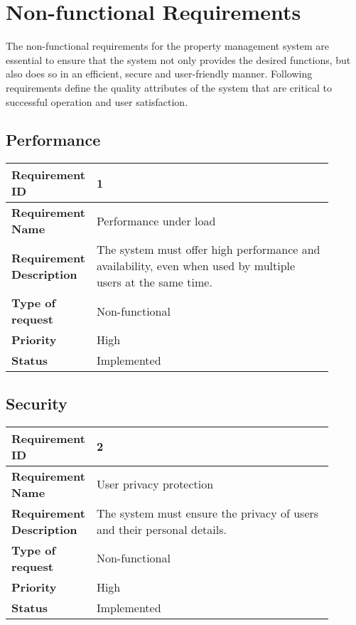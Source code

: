 \section{Non-functional Requirements}
The non-functional requirements for the property management system are essential to ensure that the system not only provides the desired functions, but also does so in an efficient, secure and user-friendly manner. Following requirements define the quality attributes of the system that are critical to successful operation and user satisfaction.

\subsection{Performance}
\begin{table}[htbp]
  \centering
\begin{tabular}{|m{0.15\linewidth}|m{0.75\linewidth}|}
    \hline
    \textbf{Requirement ID} & 1 \\
    \hline
    \textbf{Requirement Name} & Performance under load \\
    \hline
    \textbf{Requirement Description} & The system must offer high performance and availability, even when used by multiple users at the same time. \\
    \hline
    \textbf{Type of request} & Non-functional \\
    \hline
    \textbf{Priority} & High \\
    \hline
    \textbf{Status} & Implemented \\
    \hline
  \end{tabular}
\end{table}

\subsection{Security}
\begin{table}[htbp]
  \centering
\begin{tabular}{|m{0.15\linewidth}|m{0.75\linewidth}|}
    \hline
    \textbf{Requirement ID} & 2 \\
    \hline
    \textbf{Requirement Name} & User privacy protection \\
    \hline
    \textbf{Requirement Description} & The system must ensure the privacy of users and their personal details. \\
    \hline
    \textbf{Type of request} & Non-functional \\
    \hline
    \textbf{Priority} & High \\
    \hline
    \textbf{Status} & Implemented \\
    \hline
  \end{tabular}
\end{table}

